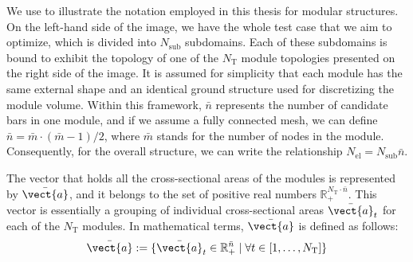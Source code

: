 We use  to illustrate the notation employed in this thesis for modular structures. On the left-hand side of the image, we have the whole test case that we aim to optimize, which is divided into $N_\text{sub}$ subdomains. Each of these subdomains is bound to exhibit the topology of one of the $N_\text{T}$ module topologies presented on the right side of the image. It is assumed for simplicity that each module has the same external shape and an identical ground structure used for discretizing the module volume. Within this framework, $\bar{n}$ represents the number of candidate bars in one module, and if we assume a fully connected mesh, we can define $\bar{n} = \bar{m} \cdot (\bar{m}-1)/2$, where $\bar{m}$ stands for the number of nodes in the module. Consequently, for the overall structure, we can write the relationship $N_{\text{el}} = N_{\text{sub}}\bar{n}$.

The vector that holds all the cross-sectional areas of the modules is represented by $\bar{\vect{a}}$, and it belongs to the set of positive real numbers $\mathbb{R}_+^{N_\text{T} \cdot \bar{n}}$. This vector is essentially a grouping of individual cross-sectional areas $\bar{\vect{a}}_t$ for each of the $N_\text{T}$ modules. In mathematical terms, $\bar{\vect{a}}$ is defined as follows:
\begin{equation}
    \bar{\vect{a}} :=  \{ \bar{\vect{a}}_t \in \mathbb{R}_+^{\bar{n}} \;|\; \forall t \in [1,\dots,N_\text{T}]\}
\end{equation}

